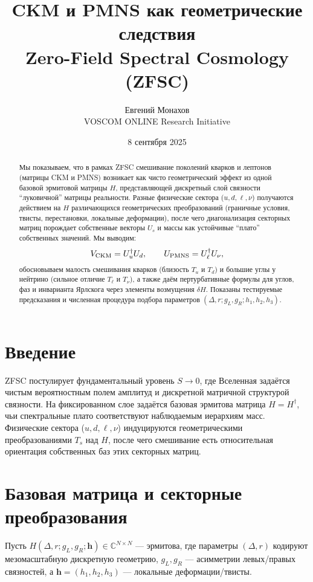 \documentclass[12pt,a4paper]{article}
\title{CKM и PMNS как геометрические следствия\\
Zero-Field Spectral Cosmology (ZFSC)}
\author{Евгений Монахов \\ VOSCOM ONLINE Research Initiative}
\date{8 сентября 2025}
\begin{document}
\maketitle

\begin{abstract}
Мы показываем, что в рамках ZFSC смешивание поколений кварков и лептонов (матрицы CKM и PMNS) возникает как чисто геометрический эффект из одной базовой эрмитовой матрицы $H$, представляющей дискретный слой связности ``луковичной'' матрицы реальности. Разные физические сектора ($u,d,\ell,\nu$) получаются действием на $H$ различающихся геометрических преобразований (граничные условия, твисты, перестановки, локальные деформации), после чего диагонализация секторных матриц порождает собственные векторы $U_s$ и массы как устойчивые ``плато'' собственных значений. Мы выводим: 
\[
V_{\rm CKM}=U_u^\dagger U_d,\qquad U_{\rm PMNS}=U_\ell^\dagger U_\nu,
\]
обосновываем малость смешивания кварков (близость $T_u$ и $T_d$) и большие углы у нейтрино (сильное отличие $T_\ell$ и $T_\nu$), а также даём пертурбативные формулы для углов, фаз и инварианта Ярлскога через элементы возмущения $\delta H$. Показаны тестируемые предсказания и численная процедура подбора параметров $(\Delta,r; g_L,g_R; h_1,h_2,h_3)$.
\end{abstract}

\section*{Введение}
ZFSC постулирует фундаментальный уровень $S\to 0$, где Вселенная задаётся чистым вероятностным полем амплитуд и дискретной матричной структурой связности. На фиксированном слое задаётся базовая эрмитова матрица $H=H^\dagger$, чьи спектральные плато соответствуют наблюдаемым иерархиям масс. Физические сектора ($u,d,\ell,\nu$) индуцируются геометрическими преобразованиями $T_s$ над $H$, после чего смешивание есть относительная ориентация собственных баз этих секторных матриц.

\section{Базовая матрица и секторные преобразования}
Пусть $H(\Delta,r;g_L,g_R;\bm{h})\in\mathbb{C}^{N\times N}$ — эрмитова, где параметры $(\Delta,r)$ кодируют мезомасштабную дискретную геометрию, $g_L,g_R$ — асимметрии левых/правых связностей, а $\bm{h}=(h_1,h_2,h_3)$ — локальные деформации/твисты.
\end{document}
